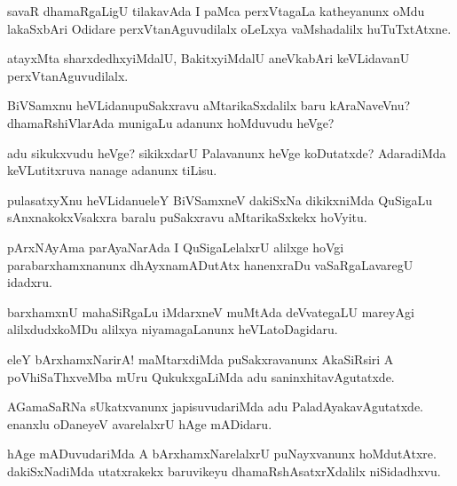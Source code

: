 \begin{mng}
savaR dhamaRgaLigU tilakavAda I paMca perxVtagaLa katheyanunx oMdu lakaSxbAri Odidare perxVtanAguvudilalx oLeLxya vaMshadalilx huTuTxtAtxne.
\end{mng}

\begin{mng}
atayxMta sharxdedhxyiMdalU, BakitxyiMdalU aneVkabAri keVLidavanU perxVtanAguvudilalx.
\end{mng}

\begin{mng}
BiVSamxnu heVLidanu\mdash puSakxravu aMtarikaSxdalilx baru kAraNaveVnu? dhamaRshiVlarAda munigaLu adanunx hoMduvudu heVge?
\end{mng}

\begin{mng}
adu sikukxvudu heVge? sikikxdarU Palavanunx heVge koDutatxde? AdaradiMda keVLutitxruva nanage adanunx tiLisu.
\end{mng}

\begin{mng}
pulasatxyXnu heVLidanu\mdash eleY BiVSamxneV dakiSxNa dikikxniMda QuSigaLu sAnxnakokxVsakxra baralu puSakxravu aMtarikaSxkekx hoVyitu.
\end{mng}

\begin{mng}
pArxNAyAma parAyaNarAda I QuSigaLelalxrU alilxge hoVgi parabarxhamxnanunx dhAyxnamADutAtx hanenxraDu vaSaRgaLavaregU idadxru.
\end{mng}

\begin{mng}
barxhamxnU mahaSiRgaLu iMdarxneV muMtAda deVvategaLU mareyAgi alilxdudxkoMDu alilxya niyamagaLanunx heVLatoDagidaru.
\end{mng}

\begin{mng}
eleY bArxhamxNarirA! maMtarxdiMda puSakxravanunx AkaSiRsiri A poVhiSaThxveMba mUru QukukxgaLiMda adu saninxhitavAgutatxde.
\end{mng}

\begin{mng}
AGamaSaRNa sUkatxvanunx japisuvudariMda adu PaladAyakavAgutatxde. enanxlu oDaneyeV avarelalxrU hAge mADidaru.
\end{mng}

\begin{mng}
hAge mADuvudariMda A bArxhamxNarelalxrU puNayxvanunx hoMdutAtxre. dakiSxNadiMda utatxrakekx baruvikeyu dhamaRshAsatxrXdalilx niSidadhxvu.
\end{mng}

